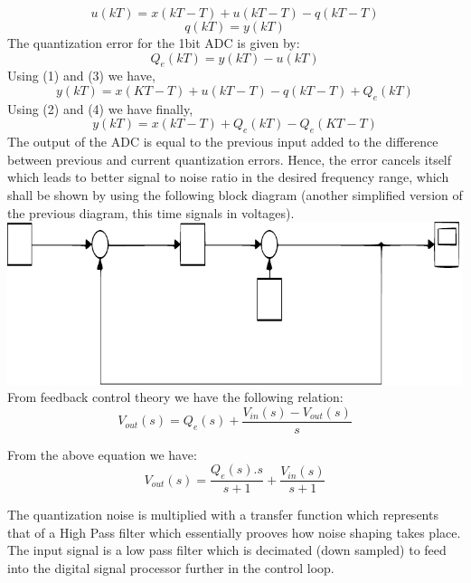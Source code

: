 \documentclass[colorlinks=true,pdfstartview=FitV,linkcolor=blue,
            citecolor=red,urlcolor=magenta]{ligodoc}
\begin{document}
\begin{equation}
u(kT)=x(kT-T)+u(kT-T)-q(kT-T)
\end{equation}
\begin{equation}
q(kT)=y(kT)
\end{equation}
The quantization error for the 1bit ADC is given by:
\begin{equation}
Q_{e}(kT)=y(kT)-u(kT)
\end{equation}
Using (1) and (3) we have,
\begin{equation}
y(kT)=x(KT-T)+u(kT-T)-q(kT-T)+Q_{e}(kT)
\end{equation}
Using (2) and (4) we have finally,
\begin{equation}
y(kT)=x(kT-T)+Q_{e}(kT)-Q_{e}(KT-T)
\end{equation}
The output of the ADC is equal to the previous input added to the difference between previous and current quantization errors. Hence, the error cancels itself which leads to better signal to noise ratio in the desired frequency range, which shall be shown by using the following block diagram (another simplified version of the previous diagram, this time signals in voltages).
\includegraphics[scale=0.5]{Delta_Sigma_ADC_Simplified_Block}
From feedback control theory we have the following relation:
\begin{equation}
V_{out}(s)=Q_{e}(s)+\frac{V_{in}(s)-V_{out}(s)}{s}
\end{equation}

From the above equation we have:
\begin{equation}
V_{out}(s)=\frac{Q_{e}(s).s}{s+1} + \frac{V_{in}(s)}{s+1}
\end{equation}

The quantization noise is multiplied with a transfer function which represents that of a High Pass filter which essentially prooves how noise shaping takes place. The input signal is a low pass filter which is decimated (down sampled) to feed into the digital signal processor further in the control loop.
\end{document}
